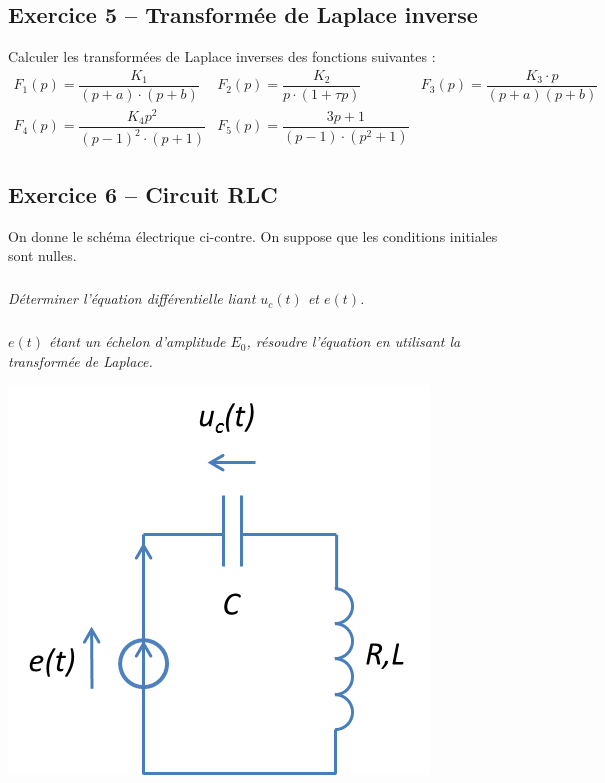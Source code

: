 \documentclass[11pt,oneside]{article}
\begin{document}
\subsection*{Exercice 5 -- Transformée de Laplace inverse}
\setcounter{subparagraph}{0}
Calculer les transformées de Laplace inverses des fonctions suivantes :
$$
\begin{array}{ccc}
F_1(p)= \dfrac{K_1}{\left( p+a \right) \cdot \left(p+b \right)} & 
F_2(p)= \dfrac{K_2}{p\cdot \left(1+\tau p \right)} &
F_3(p)= \dfrac{K_3 \cdot p}{\left(p+	a\right)\left(p+b\right)}  \\
F_4(p)= \dfrac{K_4 p^2}{\left( p-1 \right)^2 \cdot \left(p+1\right)} & 
F_5(p)= \dfrac{3p+1}{\left(p-1\right)\cdot \left(p^2+1\right)} 
\end{array}
$$


\subsection*{Exercice 6 -- Circuit RLC}
\setcounter{subparagraph}{0}
\begin{minipage}[c]{.7\linewidth}
On donne le schéma électrique ci-contre. On suppose que les conditions initiales sont nulles. 

\subparagraph{}
\textit{Déterminer l'équation différentielle liant $u_c(t)$ et $e(t)$.}

\subparagraph{}
\textit{$e(t)$ étant un échelon d'amplitude $E_0$, résoudre l'équation en utilisant la transformée de Laplace.}
\end{minipage} \hfill
\begin{minipage}[c]{.25\linewidth}
\begin{center}
\includegraphics[width=.95\textwidth]{png/RLC.png}
\end{center}
\end{minipage}
\end{document}
